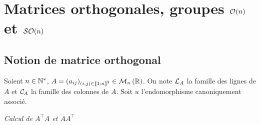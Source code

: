 \section{Matrices orthogonales, groupes \(\mathcal{O}\!\left(n\right)\) et \(\mathcal{SO}\!\left(n\right)\)}

\subsection{Notion de matrice orthogonal}

Soient \(n \in \mathbb{N}^*\), \(A=(a_{ij})_{(i,j) \in \mathopen{\llbracket}1\mathclose{}\mathpunct{};n\mathclose{\rrbracket}^2} \in \mathcal{M}_{n}\left(\mathbb{R}\right)\). On note \(\mathcal{L}_A\) la famille des lignes de \(A\) et \(\mathcal{C}_A\) la famille des colonnes de \(A\). Soit \(u\) l'endomorphisme canoniquement associé.

\emph{Calcul de \(A^\top A\) et \(A A^\top\)}

